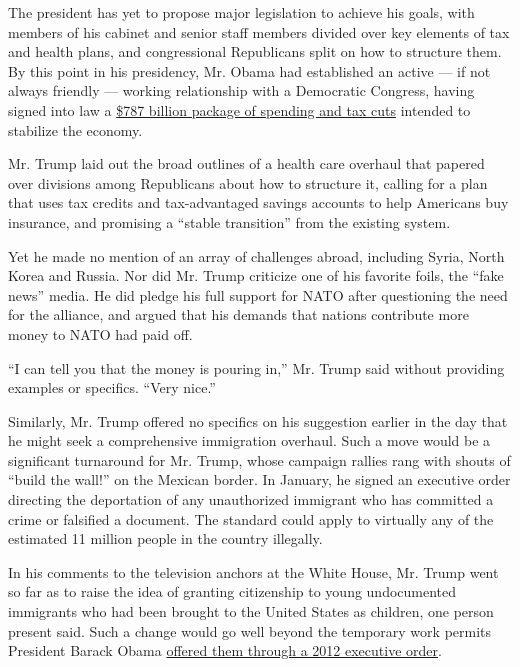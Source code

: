The president has yet to propose major legislation to achieve his goals,
with members of his cabinet and senior staff members divided over key
elements of tax and health plans, and congressional Republicans split on
how to structure them. By this point in his presidency, Mr. Obama had
established an active --- if not always friendly --- working
relationship with a Democratic Congress, having signed into law a
\href{https://www.nytimes3xbfgragh.onion/interactive/projects/44th_president/stimulus}{\$787
billion package of spending and tax cuts} intended to stabilize the
economy.

Mr. Trump laid out the broad outlines of a health care overhaul that
papered over divisions among Republicans about how to structure it,
calling for a plan that uses tax credits and tax-advantaged savings
accounts to help Americans buy insurance, and promising a ``stable
transition'' from the existing system.

Yet he made no mention of an array of challenges abroad, including
Syria, North Korea and Russia. Nor did Mr. Trump criticize one of his
favorite foils, the ``fake news'' media. He did pledge his full support
for NATO after questioning the need for the alliance, and argued that
his demands that nations contribute more money to NATO had paid off.

``I can tell you that the money is pouring in,'' Mr. Trump said without
providing examples or specifics. ``Very nice.''

Similarly, Mr. Trump offered no specifics on his suggestion earlier in
the day that he might seek a comprehensive immigration overhaul. Such a
move would be a significant turnaround for Mr. Trump, whose campaign
rallies rang with shouts of ``build the wall!'' on the Mexican border.
In January, he signed an executive order directing the deportation of
any unauthorized immigrant who has committed a crime or falsified a
document. The standard could apply to virtually any of the estimated 11
million people in the country illegally.

In his comments to the television anchors at the White House, Mr. Trump
went so far as to raise the idea of granting citizenship to young
undocumented immigrants who had been brought to the United States as
children, one person present said. Such a change would go well beyond
the temporary work permits President Barack Obama
\href{http://www.nytimes3xbfgragh.onion/2012/06/16/us/us-to-stop-deporting-some-illegal-immigrants.html}{offered
them through a 2012 executive order}.

